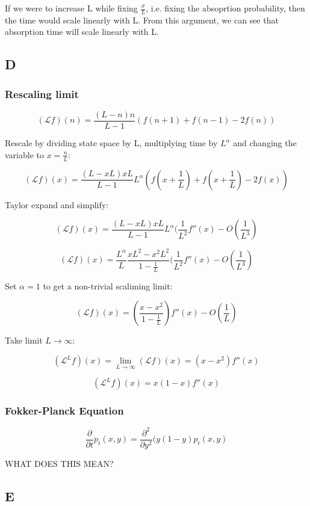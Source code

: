 \documentclass{article}
\begin{document}
If we were to increase L while fixing $\frac{\sigma}{L}$, i.e. fixing the absoprtion probability, then the time would scale linearly with L. From this argument, we can see that absorption time will scale linearly with L.  


\subsection{D}

\subsubsection{Rescaling limit}

$$(\mathcal{L}f)(n) = \frac{(L-n)n}{L-1}(f(n+1) + f(n-1) - 2f(n))$$

Rescale by dividing state space by L, multiplying time by $L^\alpha$ and changing the variable to $x=\frac{n}{L}$:

$$(\mathcal{L}f)(x) = \frac{(L-xL)xL}{L-1}L^\alpha(f(x+\frac{1}{L}) + f(x+\frac{1}{L}) - 2f(x))$$

Taylor expand and simplify:

$$(\mathcal{L}f)(x) = \frac{(L-xL)xL}{L-1}L^\alpha(\frac{1}{L^2}f''(x) - O(\frac{1}{L^3})$$

$$(\mathcal{L}f)(x) = \frac{L^\alpha}{L} \frac{xL^2 - x^2L^2}{1-\frac{1}{L}}(\frac{1}{L^2}f''(x) - O(\frac{1}{L^3})$$

Set $\alpha=1$ to get a non-trivial scaliming limit:

$$(\mathcal{L}f)(x) = (\frac{x - x^2}{1-\frac{1}{L}})f''(x) - O(\frac{1}{L})$$

Take limit $L \to \infty$:

$$(\mathcal{L}^Lf)(x) = \lim_{L \to \infty} (\mathcal{L}f)(x) = (x - x^2)f''(x)$$

$$(\mathcal{L}^Lf)(x) = x(1 - x)f''(x)$$

\subsubsection{Fokker-Planck Equation}

$$\frac{\partial}{\partial t}p_t(x,y) = \frac{\partial^2}{\partial y^2} (y(1-y) p_t(x,y)$$

WHAT DOES THIS MEAN?

\subsection{E}
\end{document}
